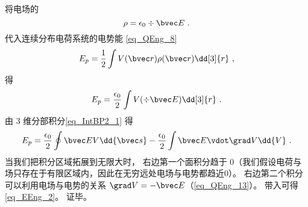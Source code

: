 将电场的
\begin{equation}
\rho = \epsilon_0\div \bvec E~.
\end{equation}
代入连续分布电荷系统的电势能 \autoref{eq_QEng_8} 
\begin{equation}
E_p = \frac 12 \int V(\bvec r) \rho(\bvec r) \dd[3]{r}~,
\end{equation}
得
\begin{equation}
E_p = \frac{\epsilon_0}2 \int V (\div \bvec E) \dd[3]{r}~.
\end{equation}
由 3 维分部积分\autoref{eq_IntBP2_1} 得
\begin{equation}
E_p = \frac{\epsilon_0}2 \oint \bvec E V \dd{\bvec s} - \frac{\epsilon_0}{2} \int \bvec E \vdot \grad V \dd{V}~.
\end{equation}
当我们把积分区域拓展到无限大时， 右边第一个面积分趋于 0（我们假设电荷与场只存在于有限区域内，因此在无穷远处电场与电势都趋近$0$）。 右边第二个积分可以利用电场与电势的关系 $\grad V = -\bvec E$（\autoref{eq_QEng_13}）。 带入可得\autoref{eq_EEng_2}。 证毕。
